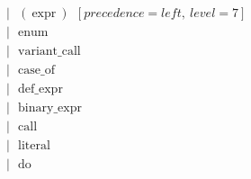 \documentclass{article}
\begin{document}
\begin{align*}
                                      & |\ \ \ (\ \text{expr}\ )\ \ [precedence=left,\ level=7]                                                                                                                                                                   \\
                                      & |\ \ \ \text{enum}                                                                                                                                                                                                        \\
                                      & |\ \ \ \text{variant\_call}                                                                                                                                                                                               \\
                                      & |\ \ \ \text{case\_of}                                                                                                                                                                                                    \\
                                      & |\ \ \ \text{def\_expr}                                                                                                                                                                                                   \\
                                      & |\ \ \ \text{binary\_expr}                                                                                                                                                                                                \\
                                      & |\ \ \ \text{call}                                                                                                                                                                                                        \\
                                      & |\ \ \ \text{literal}                                                                                                                                                                                                     \\
                                      & |\ \ \ \text{do}                                                                                                                                                                                                          \\

\end{align*}
\end{document}
